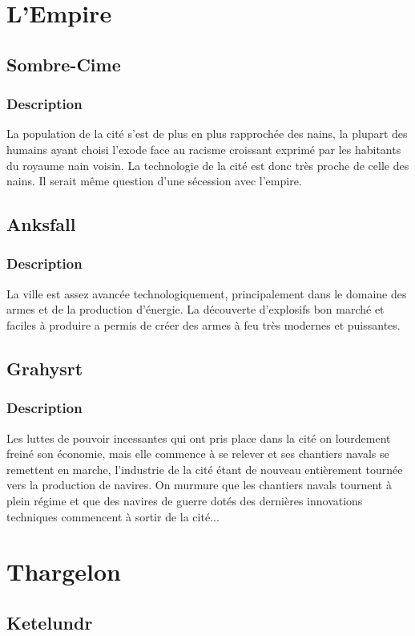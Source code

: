 \section{L'Empire}
\subsection{Sombre-Cime}
\subsubsection{Description}
La population de la cité s'est de plus en plus rapprochée des nains, la plupart des humains ayant choisi l'exode face au racisme croissant exprimé par les habitants du royaume nain voisin. La technologie de la cité est donc très proche de celle des nains. Il serait même question d'une sécession avec l'empire.
\subsection{Anksfall}
\subsubsection{Description}
La ville est assez avancée technologiquement, principalement dans le domaine des armes et de la production d'énergie. La découverte d'explosifs bon marché et faciles à produire a permis de créer des armes à feu très modernes et puissantes.
\subsection{Grahysrt}
\subsubsection{Description}
Les luttes de pouvoir incessantes qui ont pris place dans la cité on lourdement freiné son économie, mais elle commence à se relever et ses chantiers navals se remettent en marche, l'industrie de la cité étant de nouveau entièrement tournée vers la production de navires. On murmure que les chantiers navals tournent à plein régime et que des navires de guerre dotés des dernières innovations techniques commencent à sortir de la cité...
\section{Thargelon}
\subsection{Ketelundr}
